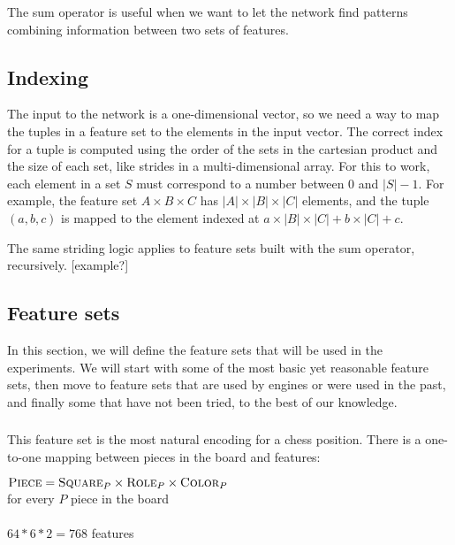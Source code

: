 The sum operator is useful when we want to let the network find patterns combining information between two sets of features.



\subsection{Indexing}

The input to the network is a one-dimensional vector, so we need a way to map the tuples in a feature set to the elements in the input vector. The correct index for a tuple is computed using the order of the sets in the cartesian product and the size of each set, like strides in a multi-dimensional array. For this to work, each element in a set $S$ must correspond to a number between $0$ and $|S| - 1$. For example, the feature set $A \times B \times C$ has $|A| \times |B| \times |C|$ elements, and the tuple $(a, b, c)$ is mapped to the element indexed at $a \times |B| \times |C| + b \times |C| + c$.

The same striding logic applies to feature sets built with the sum operator, recursively. [example?]

\subsection{Feature sets}

In this section, we will define the feature sets that will be used in the experiments. We will start with some of the most basic yet reasonable feature sets, then move to feature sets that are used by engines or were used in the past, and finally some that have not been tried, to the best of our knowledge.

\subsubsection{\mdseries{}}

This feature set is the most natural encoding for a chess position. There is a one-to-one mapping between pieces in the board and features:

\begin{center}
    $\textsc{Piece} = \textsc{Square}_{P} \times \textsc{Role}_{P} \times \textsc{Color}_{P}$ \\
    for every $P$ piece in the board \\
    ~\\
    $64*6*2=768$ features
\end{center}

